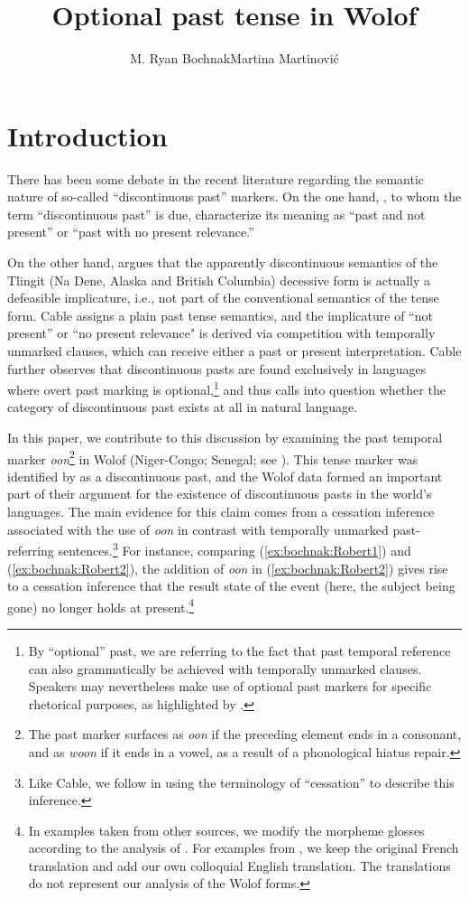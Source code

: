 \documentclass[output=paper,newtxmath,modfonts,nonflat,draftmode]{langsci/langscibook}
\title{Optional past tense in Wolof}
\author{M. Ryan Bochnak\affiliation{University of Konstanz}\lastand Martina Martinović\affiliation{University of Florida}}
\begin{document}
\maketitle
\section{Introduction}

There has been some debate in the recent literature regarding the semantic nature of so-called ``discontinuous past'' markers. On the one hand, \citet{Plungian2006}, to whom the term ``discontinuous past'' is due, characterize its meaning as ``past and not present'' or ``past with no present relevance.'' 

On the other hand, \cite{Cable2017a}\largerpage 
argues that the apparently discontinuous semantics of the Tlingit (Na Dene, Alaska and British Columbia) decessive form \citep{Leer1991} is actually a defeasible implicature, i.e., not part of the conventional semantics of the tense form. Cable assigns a plain past tense semantics, and the implicature of ``not present'' or ``no present relevance" is derived via competition with temporally unmarked clauses, which can receive either a past or present interpretation. Cable further observes that discontinuous pasts are found exclusively in languages where overt past marking is optional,\footnote{By ``optional'' past, we are referring to the fact that past temporal reference can also grammatically be achieved with temporally unmarked clauses. Speakers may nevertheless make use of optional past markers for specific rhetorical purposes, as highlighted by \citet{Plungian2006}.} and thus calls into question whether the category of discontinuous past exists at all in natural language.


In this paper, we contribute to this discussion by examining the past temporal marker
\textit{oon}\footnote{The past marker surfaces as
  \textit{oon} if the preceding element ends in a consonant, and as
  \textit{woon} if it ends in a vowel, as a result of a phonological hiatus repair.} in Wolof (Niger-Congo; Senegal; see \citealt{church81systeme, robert91approche}). This tense marker was identified by \citet{Plungian2006} as a discontinuous past, and the Wolof data formed an important part of their argument for the existence of discontinuous pasts in the world's languages. The main evidence for this claim comes from a cessation inference associated with the use of \textit{oon} in contrast with temporally unmarked past-referring sentences.\footnote{Like Cable, we follow \citet{altshuler12moment} in using the terminology of ``cessation'' to describe this inference.} For instance, comparing (\ref{ex:bochnak:Robert1}) and (\ref{ex:bochnak:Robert2}), the addition of \textit{oon} in (\ref{ex:bochnak:Robert2}) gives rise to a cessation inference that the result state of the event (here, the subject being gone) no longer holds at present.\footnote{In examples taken from other sources, we modify the morpheme glosses according to the analysis of \citet{Martinovic2015b}. For examples from \citealt{robert91approche}, we keep the original French translation and add our own colloquial English translation. The translations do not represent our analysis of the Wolof forms.}
\end{document}

